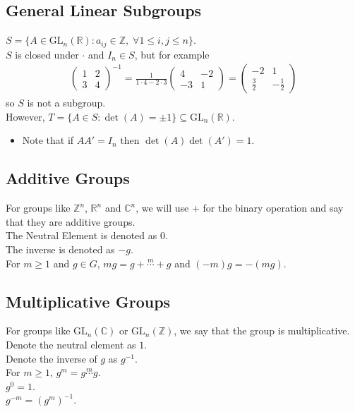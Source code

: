 \documentclass[11pt]{article}
\newcommand{\0}{\emptyset}
\newcommand{\Z}{\mathbb{Z}}
\newcommand{\R}{\mathbb{R}}
\newcommand{\C}{\mathbb{C}}
\begin{document}
\subsection*{General Linear Subgroups}
\label{sec:org2dc6011}
\(S=\{A\in\text{GL}_{n}(\R):a_{ij}\in\Z,\;\forall 1\leq i,j\leq n\}\).\\[0pt]
\(S\) is closed under \(\cdot\) and \(I_{n}\in S\), but for example\\[0pt]
\begin{align*}
  \begin{pmatrix}
    1 & 2 \\
    3 & 4
  \end{pmatrix}^{-1}
  = \frac{1}{1\cdot4-2\cdot3}
  \begin{pmatrix}
    4 & -2 \\
    -3 & 1
  \end{pmatrix}
  =
  \begin{pmatrix}
    -2 & 1 \\
    \frac{3}{2} & -\frac{1}{2}
  \end{pmatrix}
\end{align*}
so \(S\) is not a subgroup.\\[0pt]
However, \(T=\{A\in S:\det(A)=\pm1\} \subseteq \text{GL}_{n}(\R)\).\\[0pt]
\begin{itemize}
\item Note that if \(AA'=I_{n}\) then \(\det(A)\det(A')=1\).\\[0pt]
\end{itemize}
\subsection*{Additive Groups}
\label{sec:orgc66d898}
For groups like \(\Z^{n}\), \(\R^{n}\) and \(\C^{n}\), we will use \(+\) for the binary operation and say that they are additive groups.\\[0pt]
The Neutral Element is denoted as \(0\).\\[0pt]
The inverse is denoted as \(-g\).\\[0pt]
For \(m\geq 1\) and \(g\in G\), \(mg=g+\overset{m}{\cdots}+g\) and \((-m)g=-(mg)\).\\[0pt]
\subsection*{Multiplicative Groups}
\label{sec:org64b5899}
For groups like \(\text{GL}_{n}(\C)\) or \(\text{GL}_{n}(\Z)\), we say that the group is multiplicative.\\[0pt]
Denote the neutral element as \(1\).\\[0pt]
Denote the inverse of \(g\) as \(g^{-1}\).\\[0pt]
For \(m\geq1\), \(g^{m}=g\overset{m}{\cdots}g\).\\[0pt]
\(g^{0}=1\).\\[0pt]
\(g^{-m}=(g^{m})^{-1}\).\\[0pt]
\end{document}
